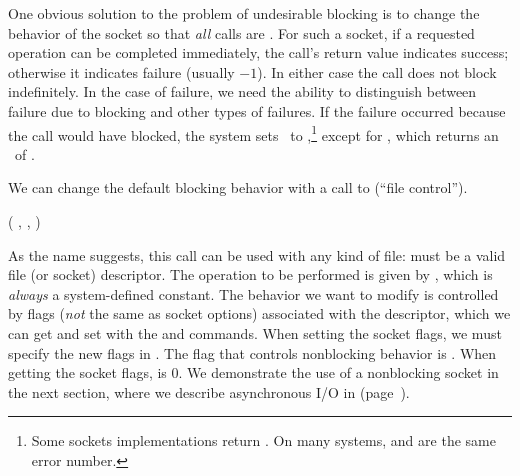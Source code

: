 \noindent One obvious solution to the problem of undesirable blocking
is to change the behavior of the socket so that \emph{all\/}
calls are .  For such a socket, 
if a requested operation can be completed immediately, the call's
return value indicates success; otherwise it indicates failure
(usually $-1$).  In either case the call does not
block indefinitely.  In the case of failure, we need the
ability to distinguish between failure due to blocking and other types
of failures.  If the failure occurred because the call would have 
blocked, the system sets \ to
,\footnote{Some sockets implementations
return
. On many systems,
 and
 are the same error number.} except for
, which returns an \ of
.

We can change the default blocking behavior with a call to
 (``file control'').

\begin{inlinefcn}
 ( ,  ,  )
\end{inlinefcn}

\noindent As the name suggests, this call can be used with any kind of file:
 must be a valid file (or socket) descriptor.
The operation to be performed is given by , which is
\emph{always\/} a system-defined constant.
The behavior we want to modify is controlled by
flags (\emph{not\/} the same as socket options) associated with the
descriptor, which we can get and set with
the  and 
commands.  When setting
the socket flags, we must specify the new flags in .
The flag that controls nonblocking behavior is
.
When getting the socket flags,  is 0.  We demonstrate
the use of a nonblocking socket in the next section,
where we describe asynchronous I/O in
 (page~\pageref{code/UDPEchoServer-SIGIO.c}).

